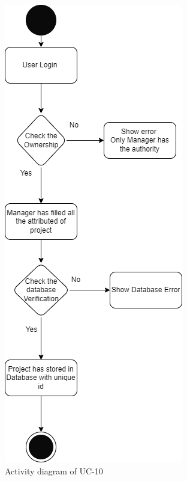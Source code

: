 \begin{figure}[H]
    \centering
    \includegraphics[scale=0.5]{./diagrams/Activity Diagram/ad-10.png}
    \caption{Activity diagram of UC-10}
    \label{fig:act-10}

\end{figure}


